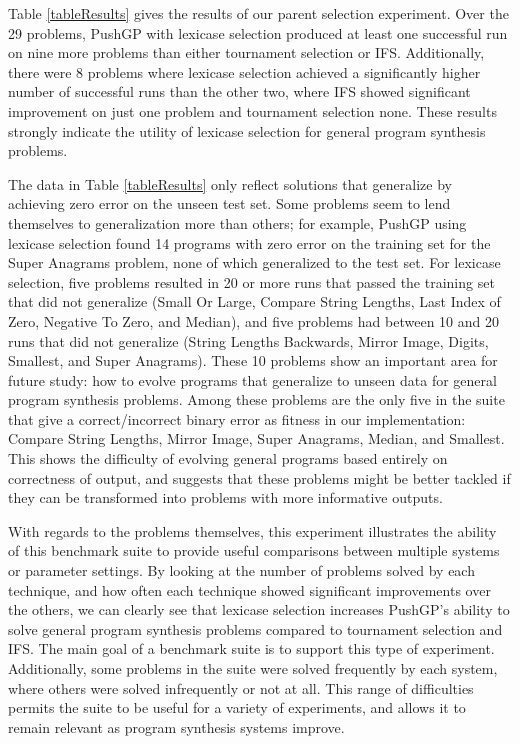 \documentclass{sig-alternate}
\begin{document}
Table \ref{tableResults} gives the results of our parent selection experiment. Over the 29 problems, PushGP with lexicase selection produced at least one successful run on nine more problems than either tournament selection or IFS.
Additionally, there were 8 problems where lexicase selection achieved a significantly higher number of successful runs than the other two, where IFS showed significant improvement on just one problem and tournament selection none. These results strongly indicate the utility of lexicase selection for general program synthesis problems.

The data in Table \ref{tableResults} only reflect solutions that generalize by achieving zero error on the unseen test set. Some problems seem to lend themselves to generalization more than others; for example, PushGP using lexicase selection found 14 programs with zero error on the training set for the Super Anagrams problem, none of which generalized to the test set. For lexicase selection, five problems resulted in 20 or more runs that passed the training set that did not generalize (Small Or Large,
Compare String Lengths,
Last Index of Zero,
Negative To Zero, and
Median),
and five problems had between 10 and 20 runs that did not generalize (String Lengths Backwards,
Mirror Image,
Digits,
Smallest, and
Super Anagrams).
These 10 problems show an important area for future study: how to evolve programs that generalize to unseen data for general program synthesis problems. Among these problems are the only five in the suite that give a correct/incorrect binary error as fitness in our implementation: Compare String Lengths, Mirror Image, Super Anagrams, Median, and Smallest. This shows the difficulty of evolving general programs based entirely on correctness of output, and suggests that these problems might be better tackled if they can be transformed into problems with more informative outputs.

%

With regards to the problems themselves, this experiment illustrates the ability of this benchmark suite to provide useful comparisons between multiple systems or parameter settings. By looking at the number of problems solved by each technique, and how often each technique showed significant improvements over the others, we can clearly see that lexicase selection increases PushGP's ability to solve general program synthesis problems compared to tournament selection and IFS. The main goal of a benchmark suite is to support this type of experiment. Additionally, some problems in the suite were solved frequently by each system, where others were solved infrequently or not at all. This range of difficulties permits the suite to be useful for a variety of experiments, and allows it to remain relevant as program synthesis systems improve.
\end{document}
